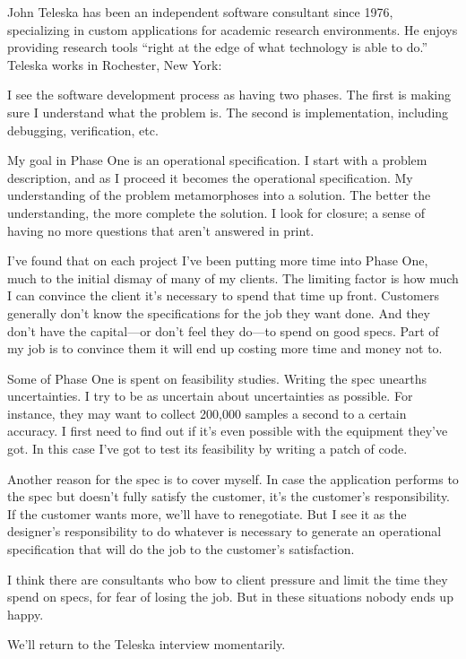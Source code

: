 \begin{interview}
\noindent John Teleska has been an independent software consultant
since 1976, specializing in custom applications for academic research
environments.  He enjoys providing research tools ``right at the edge
of what technology is able to do.'' Teleska works in Rochester, New York:

\begin{tfquot}
I see the software development process as having two phases. The first is
making sure I understand what the problem is. The second is
implementation, including debugging, verification, etc.

My goal in Phase One is an operational specification. I start with a
problem description, and as I proceed it becomes the operational
specification. My understanding of the problem metamorphoses into a
solution. The better the understanding, the more complete the
solution. I look for closure; a sense of having no more questions that
aren't answered in print.

I've found that on each project I've been putting more time into Phase
One, much to the initial dismay of many of my clients. The limiting
factor is how
much I can convince the client it's necessary to spend that time up
front.  Customers generally don't know the specifications for the job
they want done. And they don't have the capital---or don't feel they
do---to spend on good specs. Part of my job is to convince them it
will end up costing more time and money not to.

Some of Phase One is spent on feasibility studies. Writing the spec
unearths uncertainties. I try to be as uncertain about uncertainties
as possible. For instance, they may want to collect 200,000 samples a
second to a certain accuracy. I first need to find out if it's even
possible with the equipment they've got. In this case I've got to test
its feasibility by writing a patch of code.

Another reason for the spec is to cover myself. In case the
application performs to the spec but doesn't fully satisfy the
customer, it's the customer's responsibility. If the customer wants
more, we'll have to renegotiate. But I see it as the designer's
responsibility to do whatever is necessary to generate an operational
specification that will do the job to the customer's satisfaction.

I think there are consultants who bow to client pressure and limit the
time they spend on specs, for fear of losing the job. But in these
situations nobody ends up happy.
\end{tfquot}
\end{interview}
We'll return to the Teleska interview momentarily.

